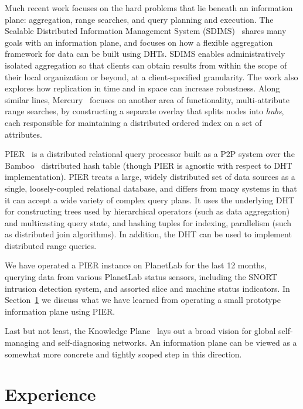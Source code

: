 \documentclass[10pt,twocolumn]{MyTightStyle}
\def\IP{information plane\xspace}
\begin{document}
Much recent work focuses on the hard problems that lie beneath an
information plane: aggregation, range searches, and query planning and
execution.  The Scalable Distributed Information Management System
(SDIMS)~\cite{Yalagandula2004} shares many goals with an information
plane, and focuses on how a 
flexible aggregation framework for data can be built using DHTs.  SDIMS
enables administratively isolated aggregation so that clients can
obtain results from within the scope of their local organization or
beyond, at a client-specified granularity.  The work also explores how
replication in time and in space can increase robustness.  Along
similar lines, Mercury~\cite{Bharambe2004} focuses on another area of
functionality, multi-attribute range searches, by constructing a 
separate overlay that splits nodes into \emph{hubs}, each responsible
for maintaining a distributed ordered index on a set of attributes. 

PIER~\cite{huebsch.pier.2003} is a distributed relational query
processor built as a P2P system over the Bamboo~\cite{rhea_usenix_2004}
distributed hash table (though PIER is agnostic with respect to DHT
implementation).  PIER treats a large, widely 
distributed set of data sources as a single, loosely-coupled relational
database, and differs from many systems in that it can accept a wide
variety of complex query plans.  It uses the underlying DHT for
constructing trees used by hierarchical operators (such as data aggregation) and multicasting query state,
and hashing tuples for indexing, parallelism (such as distributed join
algorithms).   In addition, the DHT can be used to implement
distributed range queries. 

We have operated a PIER 
instance on PlanetLab for the last 12 months, querying data from various
PlanetLab status sensors, including the SNORT~\cite{Koziol2003} intrusion
detection system, and assorted slice and machine status indicators.
In Section~\ref{sec:experience} we discuss what we have learned from
operating a small prototype information plane using PIER. 

Last but not least, the Knowledge Plane~\cite{Clark2003} lays out a
broad vision for 
global self-managing and self-diagnosing networks.   An \IP can be
viewed as a somewhat more concrete and tightly scoped step in this
direction. 


\section{Experience}
\label{sec:experience}
\end{document}
